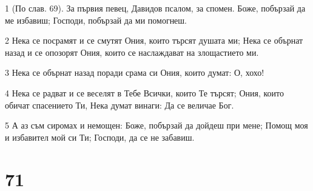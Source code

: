 \par 1 (По слав. 69). За първия певец, Давидов псалом, за спомен. Боже, побързай да ме избавиш; Господи, побързай да ми помогнеш.
\par 2 Нека се посрамят и се смутят Ония, които търсят душата ми; Нека се обърнат назад и се опозорят Ония, които се наслаждават на злощастието ми.
\par 3 Нека се обърнат назад поради срама си Ония, които думат: О, хохо!
\par 4 Нека се радват и се веселят в Тебе Всички, които Те търсят; Ония, които обичат спасението Ти, Нека думат винаги: Да се величае Бог.
\par 5 А аз съм сиромах и немощен: Боже, побързай да дойдеш при мене; Помощ моя и избавител мой си Ти; Господи, да се не забавиш.

\chapter{71}

